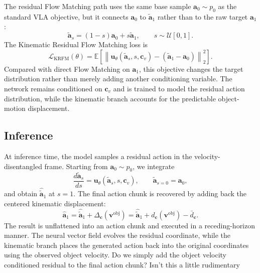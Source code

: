 \documentclass[10pt,twocolumn,letterpaper]{article}
\newcommand{\EditAP}[1]{{\color{blue} #1}}
\begin{document}
The residual Flow Matching path uses the same base sample $\mathbf a_0\sim p_0$
as the standard VLA objective, but it connects $\mathbf a_0$ to
$\widetilde{\mathbf a}_1$ rather than to the raw target $\mathbf a_1$:
\[
    \widetilde{\mathbf a}_s
    =
    (1-s)\mathbf a_0+s\widetilde{\mathbf a}_1,
    \qquad
    s\sim\mathcal U[0,1].
\]
The Kinematic Residual Flow Matching loss is
\begin{equation}
    \mathcal L_{\mathrm{KRFM}}(\theta)
    =
    \mathbb E
    \left[
        \left\|
            \mathbf u_\theta(\widetilde{\mathbf a}_s,s,\mathbf c_v)
            -
            (\widetilde{\mathbf a}_1-\mathbf a_0)
        \right\|_2^2
    \right].
    \label{eq:krfm_loss}
\end{equation}
Compared with direct Flow Matching on $\mathbf a_1$, this objective changes the
target distribution rather than merely adding another conditioning variable. The
network remains conditioned on $\mathbf c_v$ and is trained to model the residual action distribution, while the
kinematic branch accounts for the predictable object-motion displacement.

\subsection{Inference}
\label{subsec:inference}

At inference time, the model samples a residual action in the
velocity-disentangled frame. Starting from $\mathbf a_0\sim p_0$, we integrate
\[
    \frac{d\widetilde{\mathbf a}_s}{ds}
    =
    \mathbf u_\theta(\widetilde{\mathbf a}_s,s,\mathbf c_v),
    \qquad
    \widetilde{\mathbf a}_{s=0}=\mathbf a_0,
\]
and obtain $\widehat{\widetilde{\mathbf a}}_1$ at $s=1$. The final action chunk
is recovered by adding back the centered kinematic displacement:
\begin{equation}
    \widehat{\mathbf a}_1
    =
    \widehat{\widetilde{\mathbf a}}_1
    +
    \Delta_{\mathbf c}(\mathbf v^{\mathrm{obj}})
    =
    \widehat{\widetilde{\mathbf a}}_1
    +
    d_{\mathbf c}(\mathbf v^{\mathrm{obj}})
    -
    \bar d_{\mathbf c}.
    \label{eq:residual_to_raw_inference}
\end{equation}
The result is unflattened into an action chunk and executed in a
receding-horizon manner. The neural vector field evolves the residual
coordinate, while the kinematic branch places the generated action back into
the original coordinates using the observed object velocity.
\EditAP{Do we simply add the object velocity conditioned residual to the final action chunk? Isn't this a little rudimentary}
\end{document}
